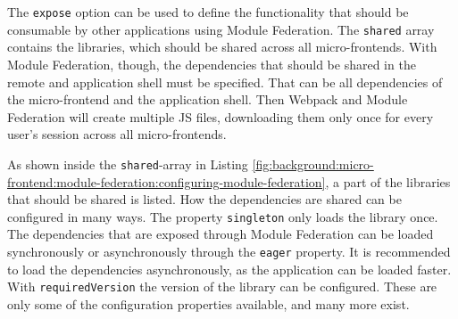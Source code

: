 \bigskip

\noindent The \texttt{expose} option can be used to define the functionality that should be consumable by other applications using Module Federation. The \texttt{shared} array contains the libraries, which should be shared across all micro-frontends. With Module Federation, though, the dependencies that should be shared in the remote and application shell must be specified. That can be all dependencies of the micro-frontend and the application shell. Then Webpack and Module Federation will create multiple \ac{JS} files, downloading them only once for every user's session across all micro-frontends. \cite[125]{book:2021:mezzalira:applied-methods:building-micro-frontends}

\bigskip

\noindent As shown inside the \texttt{shared}-array in Listing \ref{fig:background:micro-frontend:module-federation:configuring-module-federation}, a part of the libraries that should be shared is listed. How the dependencies are shared can be configured in many ways. The property \texttt{singleton} only loads the library once. The dependencies that are exposed through Module Federation can be loaded synchronously or asynchronously through the \texttt{eager} property. It is recommended to load the dependencies asynchronously, as the application can be loaded faster. With \texttt{requiredVersion} the version of the library can be configured. These are only some of the configuration properties available, and many more exist. \cite[125]{book:2021:mezzalira:applied-methods:building-micro-frontends}
